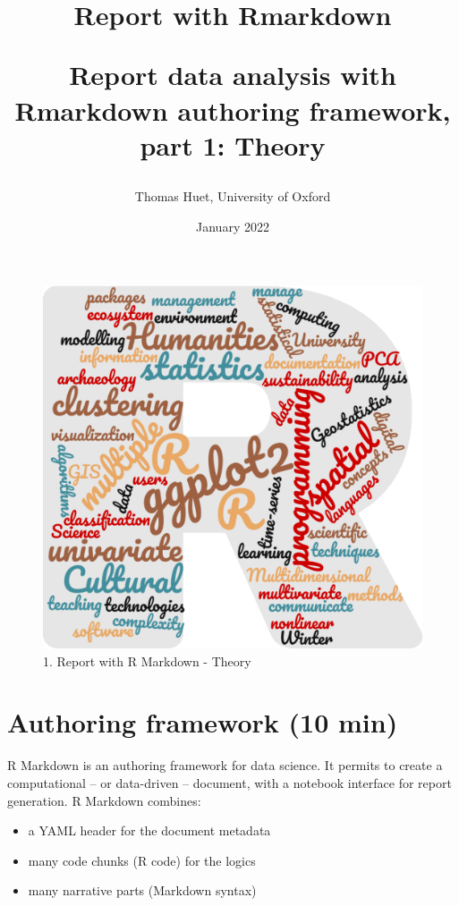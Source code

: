 \documentclass[
]{article}
\title{Report with Rmarkdown

Report data analysis with Rmarkdown authoring framework, part 1: Theory}
\author{Thomas Huet, University of Oxford}
\date{January 2022}
\begin{document}
\maketitle

{
\setcounter{tocdepth}{2}
\tableofcontents
}
\begin{figure}
\centering
\includegraphics[width=5.20833in,height=\textheight]{www/logo.png}
\caption{1. Report with R Markdown - Theory}
\end{figure}

\hypertarget{authoring-framework-10-min}{%
\section{Authoring framework (10
min)}\label{authoring-framework-10-min}}

R Markdown is an authoring framework for data science. It permits to
create a computational -- or data-driven -- document, with a notebook
interface for report generation. R Markdown combines:

\begin{itemize}
\item
  a YAML header for the document metadata
\item
  many code chunks (R code) for the logics
\item
  many narrative parts (Markdown syntax)
\end{itemize}
\end{document}
